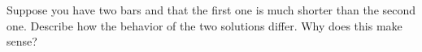 Suppose you have two bars and that the first one is much shorter than the second one. Describe how the behavior of the
two solutions differ. Why does this make sense?
\begin{solution}\ \\\\
    \ \\
\end{solution}